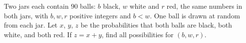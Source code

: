 Two jars each contain $90$ balls: $b$ black, $w$ white and $r$ red, the same numbers in both jars, with $b,w,r$ positive integers and $b<w$. One ball is drawn at random from each jar. Let $x$, $y$, $z$ be the probabilities that both balls are black, both white, and both red. If $z=x+y$, find all possibilities for $(b,w,r)$.
